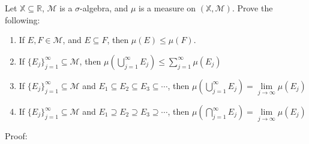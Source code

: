 \documentclass[12pt]{article}
\begin{document}
Let $\mathbb{X}\subseteq\mathbb{R}$, $\mathscr{M}$ is a $\sigma$-algebra, and $\mu$ is a measure on $(\mathbb{X},\mathscr{M})$.  Prove the following:
\begin{enumerate}
\item If $E,F\in\mathscr{M}$, and $E\subseteq F$, then $\mu(E)\leq\mu(F)$.
\item If $\{E_j\}_{j=1}^\infty\subseteq\mathscr{M}$, then $\mu\left(\bigcup_{j=1}^\infty E_j\right)\leq\sum_{j=1}^\infty\mu(E_j)$
\item If $\{E_j\}_{j=1}^\infty\subseteq\mathscr{M}$ and $E_1\subseteq E_2\subseteq E_3\subseteq\cdots$, then $\mu\left(\bigcup \limits_{j=1}^\infty E_j\right)=\lim\limits_{j\rightarrow\infty}\mu(E_j)$
\item If $\{E_j\}_{j=1}^\infty\subseteq\mathscr{M}$ and $E_1\supseteq E_2\supseteq E_3\supseteq\cdots$, then $\mu\left(\bigcap \limits_{j=1}^\infty E_j\right)=\lim\limits_{j\rightarrow\infty}\mu(E_j)$
\end{enumerate}

Proof:
\end{document}
